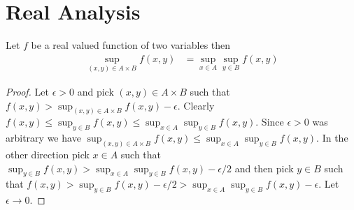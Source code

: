 \chapter{Real Analysis}

\begin{prop}\label{real:SupremumOfBivariate}Let $f$ be a real valued  function of two variables then
\begin{align*}
\sup_{(x,y) \in A \times B} f(x,y) &= \sup_{x \in A} \sup_{y \in B} f(x,y)
\end{align*}
\end{prop}
\begin{proof}
Let $\epsilon>0$ and pick $(x,y) \in A \times B$ such that $f(x,y) > \sup_{(x,y) \in A \times B} f(x,y) - \epsilon$.  Clearly $f(x,y) \leq \sup_{y \in B} f(x,y) \leq \sup_{x \in A} \sup_{y \in B} f(x,y)$.  Since $\epsilon > 0$ was arbitrary we have $\sup_{(x,y) \in A \times B} f(x,y) \leq \sup_{x \in A} \sup_{y \in B} f(x,y)$.  In the other direction pick $x \in A$ such that $\sup_{y \in B} f(x,y) > \sup_{x \in A} \sup_{y \in B} f(x,y) - \epsilon/2$ and then pick $y \in B$ such that $f(x,y) > \sup_{y \in B} f(x,y) - \epsilon/2 > \sup_{x \in A} \sup_{y \in B} f(x,y) - \epsilon$.  Let $\epsilon \to 0$.
\end{proof}

